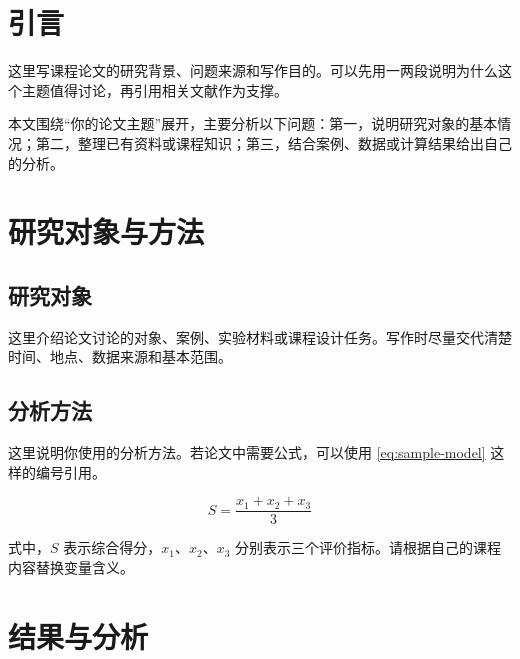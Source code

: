 %
%

\section{引言}

这里写课程论文的研究背景、问题来源和写作目的。可以先用一两段说明为什么这个主题值得讨论，再引用相关文献作为支撑\cite{sample2024}。

本文围绕“你的论文主题”展开，主要分析以下问题：第一，说明研究对象的基本情况；第二，整理已有资料或课程知识；第三，结合案例、数据或计算结果给出自己的分析。

\section{研究对象与方法}

\subsection{研究对象}

这里介绍论文讨论的对象、案例、实验材料或课程设计任务。写作时尽量交代清楚时间、地点、数据来源和基本范围。

\subsection{分析方法}

这里说明你使用的分析方法。若论文中需要公式，可以使用 \autoref{eq:sample-model} 这样的编号引用。

\begin{equation}
    S = \frac{x_1 + x_2 + x_3}{3}
    \label{eq:sample-model}
\end{equation}

式中，$S$ 表示综合得分，$x_1$、$x_2$、$x_3$ 分别表示三个评价指标。请根据自己的课程内容替换变量含义。

\section{结果与分析}

